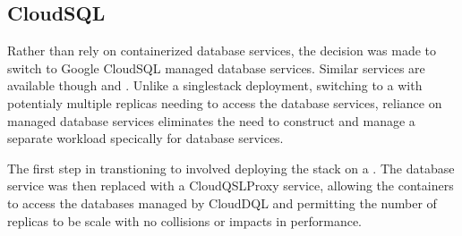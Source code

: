 \documentclass[letterpaper,12pt,english,openany,oneside]{sphinxmanual}
\begin{document}
\subsection{CloudSQL}
\label{\detokenize{euidev/infrastructure/index:cloudsql}}
\sphinxAtStartPar
Rather than rely on containerized database services, the decision was made to switch to Google CloudSQL managed database services. Similar services are available though {\hyperref[\detokenize{_static/glossary:term-AWS}]{}} and {\hyperref[\detokenize{_static/glossary:term-Azure}]{}}. Unlike a single\sphinxhyphen{}stack {\hyperref[\detokenize{_static/glossary:term-Docker}]{}} deployment, switching to a {\hyperref[\detokenize{_static/glossary:term-K8s}]{}} with potentialy multiple replicas needing to access the database services, reliance on managed database services eliminates the need to construct and manage a separate workload specically for database services.

\sphinxAtStartPar
The first step in transtioning to {\hyperref[\detokenize{_static/glossary:term-K8s}]{}} involved deploying the  stack on a {\hyperref[\detokenize{_static/glossary:term-GCE}]{}} {\hyperref[\detokenize{_static/glossary:term-VM}]{}}. The database service was then replaced with a CloudQSL\sphinxhyphen{}Proxy service, allowing the containers to access the databases managed by CloudDQL and permitting the number of replicas to be scale with no collisions or impacts in performance.
\end{document}
